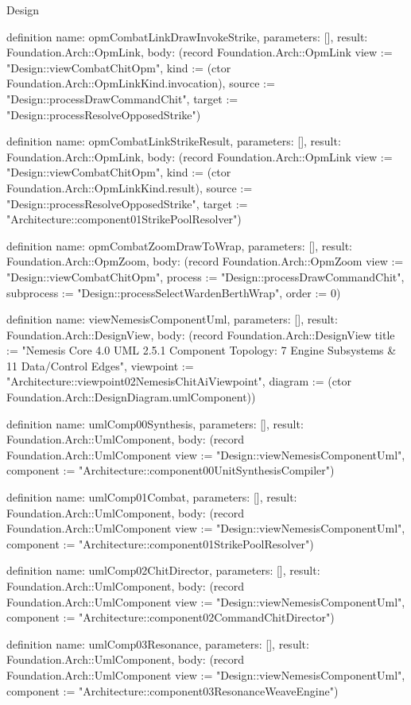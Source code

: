 \begin{lexlean}{Design}
\begin{semanticmodule}
definition{
  name: opmCombatLinkDrawInvokeStrike,
  parameters: [],
  result: Foundation.Arch::OpmLink,
  body: (record Foundation.Arch::OpmLink {view := "Design::viewCombatChitOpm", kind := (ctor Foundation.Arch::OpmLinkKind.invocation), source := "Design::processDrawCommandChit", target := "Design::processResolveOpposedStrike"})
}

definition{
  name: opmCombatLinkStrikeResult,
  parameters: [],
  result: Foundation.Arch::OpmLink,
  body: (record Foundation.Arch::OpmLink {view := "Design::viewCombatChitOpm", kind := (ctor Foundation.Arch::OpmLinkKind.result), source := "Design::processResolveOpposedStrike", target := "Architecture::component01StrikePoolResolver"})
}

definition{
  name: opmCombatZoomDrawToWrap,
  parameters: [],
  result: Foundation.Arch::OpmZoom,
  body: (record Foundation.Arch::OpmZoom {view := "Design::viewCombatChitOpm", process := "Design::processDrawCommandChit", subprocess := "Design::processSelectWardenBerthWrap", order := 0})
}

definition{
  name: viewNemesisComponentUml,
  parameters: [],
  result: Foundation.Arch::DesignView,
  body: (record Foundation.Arch::DesignView {title := "Nemesis Core 4.0 UML 2.5.1 Component Topology: 7 Engine Subsystems & 11 Data/Control Edges", viewpoint := "Architecture::viewpoint02NemesisChitAiViewpoint", diagram := (ctor Foundation.Arch::DesignDiagram.umlComponent)})
}

definition{
  name: umlComp00Synthesis,
  parameters: [],
  result: Foundation.Arch::UmlComponent,
  body: (record Foundation.Arch::UmlComponent {view := "Design::viewNemesisComponentUml", component := "Architecture::component00UnitSynthesisCompiler"})
}

definition{
  name: umlComp01Combat,
  parameters: [],
  result: Foundation.Arch::UmlComponent,
  body: (record Foundation.Arch::UmlComponent {view := "Design::viewNemesisComponentUml", component := "Architecture::component01StrikePoolResolver"})
}

definition{
  name: umlComp02ChitDirector,
  parameters: [],
  result: Foundation.Arch::UmlComponent,
  body: (record Foundation.Arch::UmlComponent {view := "Design::viewNemesisComponentUml", component := "Architecture::component02CommandChitDirector"})
}

definition{
  name: umlComp03Resonance,
  parameters: [],
  result: Foundation.Arch::UmlComponent,
  body: (record Foundation.Arch::UmlComponent {view := "Design::viewNemesisComponentUml", component := "Architecture::component03ResonanceWeaveEngine"})
}


\end{semanticmodule}
\end{lexlean}
